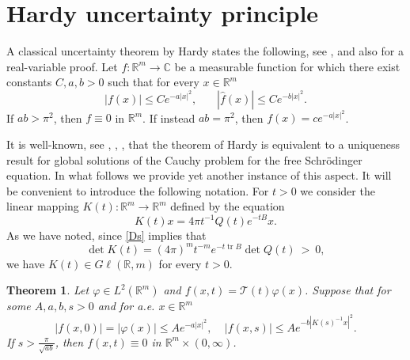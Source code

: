 \documentclass[11pt,a4paper]{amsart}
\def \R {\mathbb{R}}
\def \vf{\varphi}
\newcommand{\Rm}{\mathbb R^m}
\numberwithin{equation}{section}
\newcommand{\tr}{\operatorname{tr}}
\newtheorem{theorem}{Theorem}[section]
\numberwithin{equation}{section}
\begin{document}

\section{Hardy uncertainty principle}

A classical uncertainty theorem by Hardy states the following, see \cite{Ha}, \cite{Veluma} and also \cite[Theorem 2]{CEKPV} for a real-variable proof. Let $f:\Rm\to \mathbb C$ be a measurable function for which there exist constants $C, a, b>0$ such that for every $x\in \Rm$
\begin{equation}\label{hardy}
|f(x)|\le C e^{- a |x|^2},\ \ \ \ \ \ \ \ |\hat f(x)| \le C e^{- b |x|^2}.
\end{equation}
If $a b > \pi^2$, then $f\equiv 0$ in $\Rm$. If instead $a b = \pi^2$, then $f(x) = c e^{- a |x|^2}$. 

It is well-known, see \cite{EKPV}, \cite{Cha}, \cite{CEKPV}, that the theorem of Hardy is equivalent to a uniqueness result for global solutions of the Cauchy problem for the free Schr\"odinger equation.
In what follows we provide yet another instance of this aspect. It will be convenient to introduce the following notation. For $t>0$ we consider the linear mapping $K(t) : \Rm\to \Rm$ defined by the equation 
\begin{equation}\label{Kt}
K(t) x = 4\pi t^{-1} Q(t) e^{-tB} x.
\end{equation}
As we have noted, since \eqref{Ds} implies that
\[
\det K(t) = (4\pi)^m t^{-m} e^{-t \tr B} \det Q(t)\ >\ 0,
\] 
we have $K(t)\in G\ell(\R,m)$ for every $t>0$. 

\begin{theorem}\label{T:hardy}
Let $\vf\in L^2(\Rm)$ and $f(x,t)= \mathcal T(t) \vf(x)$. Suppose that for some $A, a, b, s>0$ and for a.e. $x\in \Rm$
\begin{equation}\label{upperG}
|f(x,0)| = |\vf(x)| \le A e^{-a |x|^2},\ \ \ \ \ |f(x,s)| \le A e^{-b |K(s)^{-1} x|^2}.
\end{equation}
If $s > \frac{\pi}{\sqrt{ab}}$,
then $f(x,t) \equiv 0$ in $\Rm\times (0,\infty)$.
\end{theorem}
\end{document}
